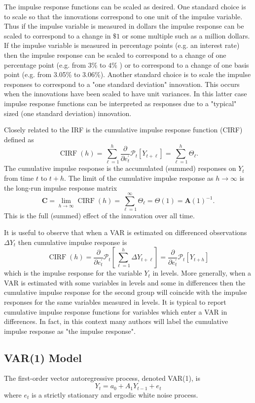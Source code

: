 \documentclass[10pt]{article}
\begin{document}
The impulse response functions can be scaled as desired. One standard choice is to scale so that the innovations correspond to one unit of the impulse variable. Thus if the impulse variable is measured in dollars the impulse response can be scaled to correspond to a change in $\$ 1$ or some multiple such as a million dollars. If the impulse variable is measured in percentage points (e.g. an interest rate) then the impulse response can be scaled to correspond to a change of one percentage point (e.g. from 3\% to $4 \%$ ) or to correspond to a change of one basis point (e.g. from 3.05\% to 3.06\%). Another standard choice is to scale the impulse responses to correspond to a "one standard deviation" innovation. This occurs when the innovations have been scaled to have unit variances. In this latter case impulse response functions can be interpreted as responses due to a "typical" sized (one standard deviation) innovation.

Closely related to the IRF is the cumulative impulse response function (CIRF) defined as
$$
\operatorname{CIRF}(h)=\sum_{\ell=1}^{h} \frac{\partial}{\partial e_{t}^{\prime}} \mathscr{P}_{t}\left[Y_{t+\ell}\right]=\sum_{\ell=1}^{h} \Theta_{\ell} .
$$
The cumulative impulse response is the accumulated (summed) responses on $Y_{t}$ from time $t$ to $t+h$. The limit of the cumulative impulse response as $h \rightarrow \infty$ is the long-run impulse response matrix
$$
\boldsymbol{C}=\lim _{h \rightarrow \infty} \operatorname{CIRF}(h)=\sum_{\ell=1}^{\infty} \Theta_{\ell}=\Theta(1)=\boldsymbol{A}(1)^{-1} .
$$
This is the full (summed) effect of the innovation over all time.

It is useful to observe that when a VAR is estimated on differenced observations $\Delta Y_{t}$ then cumulative impulse response is
$$
\operatorname{CIRF}(h)=\frac{\partial}{\partial e_{t}^{\prime}} \mathscr{P}_{t}\left[\sum_{\ell=1}^{h} \Delta Y_{t+\ell}\right]=\frac{\partial}{\partial e_{t}^{\prime}} \mathscr{P}_{t}\left[Y_{t+h}\right]
$$
which is the impulse response for the variable $Y_{t}$ in levels. More generally, when a VAR is estimated with some variables in levels and some in differences then the cumulative impulse response for the second group will coincide with the impulse responses for the same variables measured in levels. It is typical to report cumulative impulse response functions for variables which enter a VAR in differences. In fact, in this context many authors will label the cumulative impulse response as "the impulse response".

\subsection{VAR(1) Model}
The first-order vector autoregressive process, denoted VAR(1), is
$$
Y_{t}=a_{0}+A_{1} Y_{t-1}+e_{t}
$$
where $e_{t}$ is a strictly stationary and ergodic white noise process.
\end{document}
